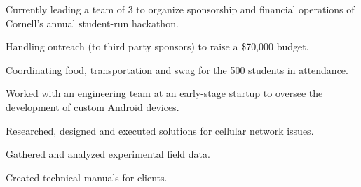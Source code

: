 \documentclass[]{deedy-resume-openfont}
\begin{document}
\begin{minipage}[t]{0.66\textwidth}
\begin{tightemize}
\item Currently leading a team of 3 to organize sponsorship and financial operations of Cornell's annual student-run hackathon.
\item Handling outreach (to third party sponsors) to raise a \$70,000 budget.
\item Coordinating food, transportation and swag for the 500 students in attendance.
\end{tightemize}
\sectionsep



\begin{tightemize}
\item Worked with an engineering team at an early-stage startup to oversee the development of custom Android devices.
\item Researched, designed and executed solutions for cellular network issues.
\item Gathered and analyzed experimental field data.
\item Created technical manuals for clients.
\end{tightemize}
\sectionsep



\end{minipage}
\end{document}
